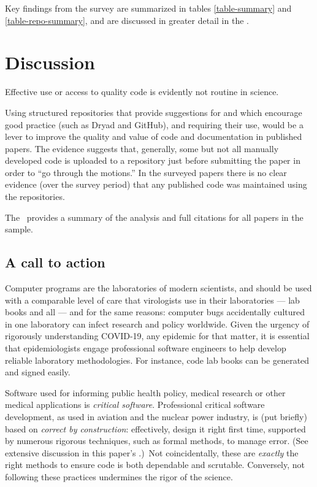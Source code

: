 Key findings from the survey are summarized in tables \ref{table-summary} and \ref{table-repo-summary}, and are discussed in greater detail in the \supplement. 

\section{Discussion}
\label{section-discussion}
\begin{change}
Effective use or access to quality code is evidently not routine in science. 
\end{change} 
Using structured repositories that provide suggestions for and which encourage good practice (such as Dryad and GitHub), and requiring their use, would be a lever to improve the quality and value of code and documentation in published papers. The evidence suggests that, generally, some but not all manually developed code is uploaded to a repository just before submitting the paper in order to ``go through the motions.'' In the surveyed papers there is no clear evidence (over the survey period) that any published code was maintained using the repositories.

The \supplement\ provides a summary of the analysis and full citations for all papers in the sample.

\subsection{A call to action}\label{summary}
Computer programs are the laboratories of modern scientists, and should be used with a comparable level of care that virologists use in their laboratories --- lab books and all \cite{notebooks} --- and for the same reasons: computer bugs accidentally cultured in one laboratory can infect research and policy worldwide. Given the urgency of rigorously understanding COVID-19, any epidemic for that matter, it is essential that epidemiologists engage professional software engineers to help develop reliable laboratory methodologies. For instance, code lab books can be generated and signed easily.

Software used for informing public health policy, medical research or other medical applications is \emph{critical software}. Professional critical software development, as used in aviation and the nuclear power industry, is (put briefly) based on \emph{correct by construction}: \cite{cbc} effectively, design it right first time, {supported by numerous rigorous techniques, such as formal methods, to manage error. (See extensive discussion in this paper's \supplement.)}\ Not coincidentally, these are \emph{exactly\/} the right methods to ensure code is both dependable and scrutable. Conversely, not following these practices undermines the rigor of the science.

